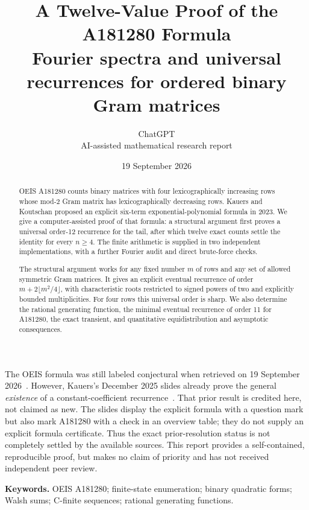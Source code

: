 \documentclass[11pt,letterpaper]{article}
\title{\vspace{-1cm}\color{ink}\bfseries
 A Twelve-Value Proof of the A181280 Formula\\[6pt]
 \large Fourier spectra and universal recurrences for ordered binary Gram matrices}
\author{ChatGPT\\\small AI-assisted mathematical research report}
\date{19 September 2026}
\theoremstyle{definition}
\newcommand{\1}{\mathbf 1}
\begin{document}
\maketitle
\begin{abstract}
OEIS A181280 counts binary matrices with four lexicographically increasing rows
whose mod-2 Gram matrix has lexicographically decreasing rows. Kauers and
Koutschan proposed an explicit six-term exponential-polynomial formula in 2023.
We give a computer-assisted proof of that formula: a structural argument first
proves a universal order-12 recurrence for the tail, after which twelve exact
counts settle the identity for every $n\ge4$. The finite arithmetic is supplied
in two independent implementations, with a further Fourier audit and direct
brute-force checks.

The structural argument works for any fixed number $m$ of rows and any set of
allowed symmetric Gram matrices. It gives an explicit eventual recurrence of
order $m+2\lfloor m^2/4\rfloor$, with characteristic roots restricted to signed
powers of two and explicitly bounded multiplicities. For four rows this
universal order is sharp. We also determine the rational generating function,
the minimal eventual recurrence of order 11 for A181280, the exact transient,
and quantitative equidistribution and asymptotic consequences.
\end{abstract}

\begin{researchbox}[title=\textbf{Status and attribution}]
The OEIS formula was still labeled conjectural when retrieved on 19 September
2026~\cite{oeis}. However, Kauers's December 2025 slides already prove the general
\emph{existence} of a constant-coefficient recurrence~\cite{slides}. That prior result is
credited here, not claimed as new. The slides display the explicit formula with
a question mark but also mark A181280 with a check in an overview table; they do
not supply an explicit formula certificate. Thus the exact prior-resolution
status is not completely settled by the available sources. This report provides
a self-contained, reproducible proof, but makes no claim of priority and has not
received independent peer review.
\end{researchbox}

\noindent\textbf{Keywords.} OEIS A181280; finite-state enumeration; binary quadratic
forms; Walsh sums; C-finite sequences; rational generating functions.

\newpage
{\small\setlength{\parskip}{0pt}\tableofcontents}
\newpage
\end{document}
